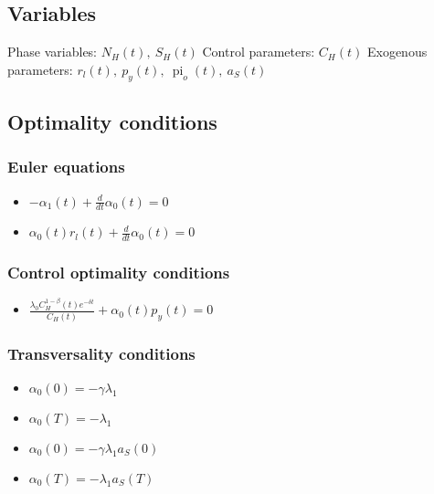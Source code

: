 \documentclass{article}
\begin{document}
\subsection{Variables}


Phase variables: $N_{H}{\left(t \right)},~S_{H}{\left(t \right)}$
\newline
Control parameters: $C_{H}{\left(t \right)}$
\newline
Exogenous parameters: $r_{l}{\left(t \right)},~p_{y}{\left(t \right)},~\operatorname{pi}_{o}{\left(t \right)},~a_{S}{\left(t \right)}$

\subsection{Optimality conditions}

\subsubsection{Euler equations}
\begin{itemize}
    \item $- \alpha_{1}{\left(t \right)} + \frac{d}{d t} \alpha_{0}{\left(t \right)} = 0$
    \item $\alpha_{0}{\left(t \right)} r_{l}{\left(t \right)} + \frac{d}{d t} \alpha_{0}{\left(t \right)} = 0$
\end{itemize}

\subsubsection{Control optimality conditions}
\begin{itemize}
    \item $\frac{\lambda_{0} C_{H}^{1 - \beta}{\left(t \right)} e^{- \delta t}}{C_{H}{\left(t \right)}} + \alpha_{0}{\left(t \right)} p_{y}{\left(t \right)} = 0$
\end{itemize}

\subsubsection{Transversality conditions}
\begin{itemize}
    \item $\alpha_{0}{\left(0 \right)} = - \gamma \lambda_{1}$
    \item $\alpha_{0}{\left(T \right)} = - \lambda_{1}$
    \item $\alpha_{0}{\left(0 \right)} = - \gamma \lambda_{1} a_{S}{\left(0 \right)}$
    \item $\alpha_{0}{\left(T \right)} = - \lambda_{1} a_{S}{\left(T \right)}$
\end{itemize}
\end{document}
